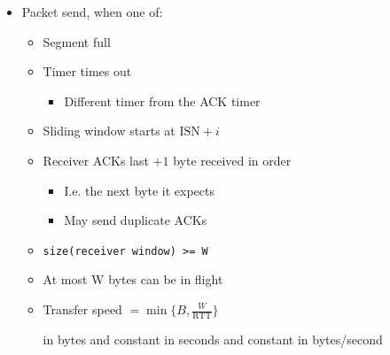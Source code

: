 \begin{itemize}
\begin{itemize}
        \end{itemize}
    \item Packet send, when one of:
        \begin{itemize}
            \item Segment full
            \item Timer times out
                \begin{itemize}
                    \item Different timer from the ACK timer
                \end{itemize}
        \end{itemize}
        \begin{itemize}
             Number of the first byte to send
                \begin{itemize}
                    \item Chosen at random
                        \begin{itemize}
                            \item For security reason
                            \item Prevent confusion of packets when reusing ports
                        \end{itemize}
                \end{itemize}
            \item Sliding window starts at $\text{ISN} + i$
            \item Receiver ACKs last $+ 1$ byte received in order
                \begin{itemize}
                    \item I.e. the next byte it expects
                    \item May send duplicate ACKs
                \end{itemize}
        \end{itemize}
        \begin{itemize}
             Number of bytes the sender can send starting at the next expected byte
            \item \verb+size(receiver window) >= W+
            \item At most W bytes can be in flight
            \item Transfer speed $= \min \{B, \frac{W}{\text{RTT}}\}$
                \begin{itemize}
                     in bytes and constant
                     in seconds and constant
                     in bytes/second
                \end{itemize}
        \end{itemize}
\end{itemize}

